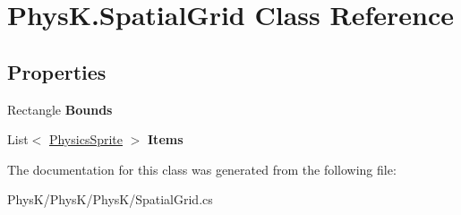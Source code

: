 \hypertarget{class_phys_k_1_1_spatial_grid}{}\section{Phys\+K.\+Spatial\+Grid Class Reference}
\label{class_phys_k_1_1_spatial_grid}
\subsection*{Properties}
\begin{DoxyCompactItemize}
\item 
Rectangle {\bfseries Bounds}\hypertarget{class_phys_k_1_1_spatial_grid_a5eee478422a07c9387716400b0516038}{}\label{class_phys_k_1_1_spatial_grid_a5eee478422a07c9387716400b0516038}

\item 
List$<$ \hyperlink{class_phys_k_1_1_physics_sprite}{Physics\+Sprite} $>$ {\bfseries Items}\hypertarget{class_phys_k_1_1_spatial_grid_a11c95e5b2bbf2556e3306106627bde92}{}\label{class_phys_k_1_1_spatial_grid_a11c95e5b2bbf2556e3306106627bde92}

\end{DoxyCompactItemize}


The documentation for this class was generated from the following file\+:\begin{DoxyCompactItemize}
\item 
Phys\+K/\+Phys\+K/\+Phys\+K/Spatial\+Grid.\+cs\end{DoxyCompactItemize}
